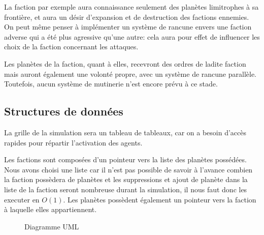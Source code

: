 \documentclass{article}
\begin{document}
      La faction par exemple aura connaissance seulement des planètes limitrophes à sa frontière, et aura un désir d'expansion et de destruction des factions ennemies. On peut même penser à implémenter un système de rancune envers une faction adverse qui a été plus agressive qu'une autre: cela aura pour effet de influencer les choix de la faction concernant les attaques.

      Les planètes de la faction, quant à elles, recevront des ordres de ladite faction mais auront également une volonté propre, avec un système de rancune parallèle. Toutefois, aucun système de mutinerie n'est encore prévu à ce stade.

    
    \subsection{Structures de données}
      La grille de la simulation sera un tableau de tableaux, car on a besoin d'accès rapides pour répartir l'activation des agents.

      Les factions sont composées d'un pointeur vers la liste des planètes possédées. Nous avons choisi une liste car il n'est pas possible de savoir à l'avance combien la faction possèdera de planètes et les suppressions et ajout de planète dans la liste de la faction seront nombreuse durant la simulation, il nous faut donc les executer en $O(1)$. Les planètes possèdent également un pointeur vers la faction à laquelle elles appartiennent.

    \begin{figure}[h]
      \begin{center}
      \end{center}
      \caption{Diagramme UML}
    \end{figure}
\end{document}
